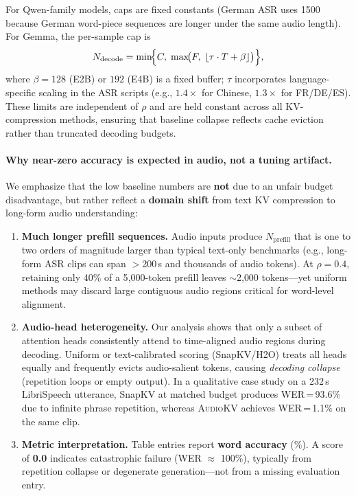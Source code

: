 \begin{answer}
    \noindent
    For Qwen-family models, caps are fixed constants (German ASR uses 1500 because German word-piece sequences are longer under the same audio length).
    For Gemma, the per-sample cap is
    \[
    N_{\text{decode}} = \min\!\Bigl\{C,\; \max\!\bigl(F,\; \lfloor \tau \cdot T + \beta \rfloor\bigr)\Bigr\},
    \]
    where $\beta{=}128$ (E2B) or $192$ (E4B) is a fixed buffer; $\tau$ incorporates language-specific scaling in the ASR scripts (e.g., $1.4{\times}$ for Chinese, $1.3{\times}$ for FR/DE/ES).
    These limits are independent of $\rho$ and are held constant across all KV-compression methods, ensuring that baseline collapse reflects cache eviction rather than truncated decoding budgets.
    
    \paragraph{Why near-zero accuracy is expected in audio, not a tuning artifact.}
    We emphasize that the low baseline numbers are \textbf{not} due to an unfair budget disadvantage, but rather reflect a \textbf{domain shift} from text KV compression to long-form audio understanding:
    \begin{enumerate}
        \item \textbf{Much longer prefill sequences.}
        Audio inputs produce $N_{\text{prefill}}$ that is one to two orders of magnitude larger than typical text-only benchmarks (e.g., long-form ASR clips can span $>$200\,s and thousands of audio tokens).
        At $\rho=0.4$, retaining only 40\% of a 5{,}000-token prefill leaves $\sim$2{,}000 tokens---yet uniform methods may discard large contiguous audio regions critical for word-level alignment.
    
        \item \textbf{Audio-head heterogeneity.}
        Our analysis shows that only a subset of attention heads consistently attend to time-aligned audio regions during decoding.
        Uniform or text-calibrated scoring (SnapKV/H2O) treats all heads equally and frequently evicts audio-salient tokens, causing \emph{decoding collapse} (repetition loops or empty output).
        In a qualitative case study on a 232\,s LibriSpeech utterance, SnapKV at matched budget produces WER\,=\,93.6\% due to infinite phrase repetition, whereas \textsc{AudioKV} achieves WER\,=\,1.1\% on the same clip.
    
        \item \textbf{Metric interpretation.}
        Table entries report \textbf{word accuracy} (\%).
        A score of \textbf{0.0} indicates catastrophic failure (WER $\approx$ 100\%), typically from repetition collapse or degenerate generation---not from a missing evaluation entry.
    

\end{enumerate}
\end{answer}
